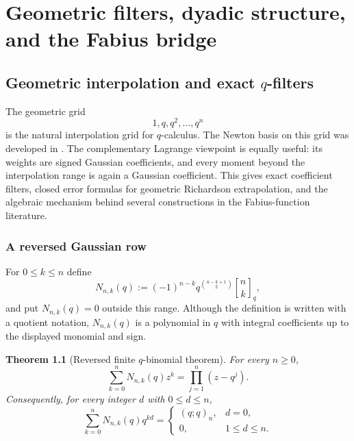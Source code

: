 \documentclass[11pt,oneside,openany]{book}
\newtheorem{theorem}{Theorem}[chapter]
\theoremstyle{definition}
\theoremstyle{remark}
\newcommand{\qbinom}[2]{\genfrac{[}{]}{0pt}{}{#1}{#2}_{q}}
\begin{document}
\part{Geometric filters, dyadic structure, and the Fabius bridge}

\chapter{Geometric interpolation and exact \texorpdfstring{$q$}{q}-filters}\label{chap:geometric-filters}

The geometric grid
\[
  1,q,q^2,\ldots,q^n
\]
is the natural interpolation grid for $q$-calculus.  The Newton basis on this grid was developed in .  The complementary Lagrange viewpoint is equally useful: its weights are signed Gaussian coefficients, and every moment beyond the interpolation range is again a Gaussian coefficient.  This gives exact coefficient filters, closed error formulas for geometric Richardson extrapolation, and the algebraic mechanism behind several constructions in the Fabius-function literature.

\section{A reversed Gaussian row}

For $0\le k\le n$ define
\begin{equation}\label{eq:reversed-gaussian-row}
 N_{n,k}(q)
 :=(-1)^{n-k}q^{\binom{n-k+1}{2}}\qbinom nk,
\end{equation}
and put $N_{n,k}(q)=0$ outside this range.  Although the definition is written with a quotient notation, $N_{n,k}(q)$ is a polynomial in $q$ with integral coefficients up to the displayed monomial and sign.

\begin{theorem}[Reversed finite $q$-binomial theorem]\label{thm:reversed-qbinomial}
For every $n\ge0$,
\begin{equation}\label{eq:reversed-product}
 \sum_{k=0}^{n}N_{n,k}(q)z^k
 =\prod_{j=1}^{n}(z-q^j).
\end{equation}
Consequently, for every integer $d$ with $0\le d\le n$,
\begin{equation}\label{eq:reversed-moments}
 \sum_{k=0}^{n}N_{n,k}(q)q^{kd}
 =
 \begin{cases}
   (q;q)_n,&d=0,\\
   0,&1\le d\le n.
 \end{cases}
\end{equation}
\end{theorem}
\end{document}
